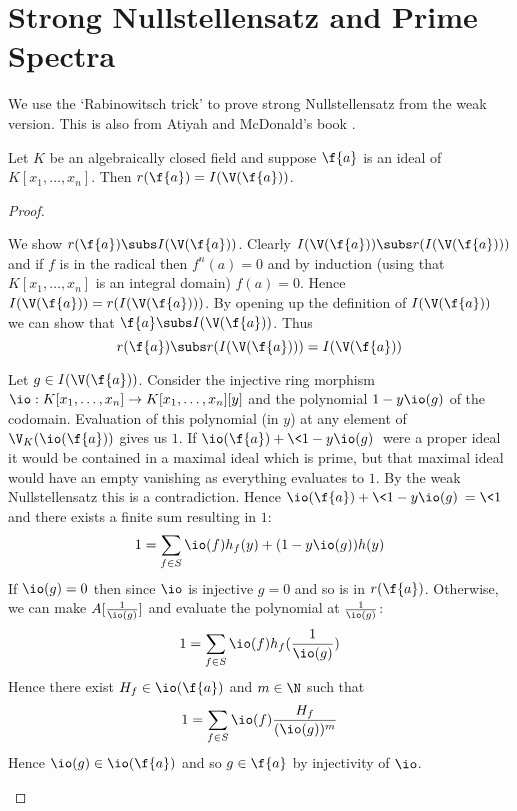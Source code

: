 \section{Strong Nullstellensatz and Prime Spectra}
We use the `Rabinowitsch trick' to prove strong Nullstellensatz
from the weak version. 
This is also from Atiyah and McDonald's book \cite{atiyah}.
\begin{prop}
    Let $K$ be an algebraically closed field and suppose 
    $\f{a}$ is an ideal of $K[x_1,\dots,x_n]$.
    Then $r(\f{a}) = I(\V(\f{a}))$.
\end{prop}
\begin{proof}
    \begin{forward}
        We show 
        $r(\f{a}) \subs I(\V(\f{a}))$.
        Clearly 
        $I(\V(\f{a})) \subs r(I(\V(\f{a})))$
        and if $f$ is in the radical then 
        $f^n (a) = 0$ and by induction 
        (using that $K[x_1,\dots,x_n]$ is an integral domain) $f(a) = 0$.
        Hence $I(\V(\f{a})) = r(I(\V(\f{a})))$.
        By opening up the definition of 
        $I(\V(\f{a}))$ we can show that 
        $\f{a} \subs I(\V(\f{a}))$.
        Thus \[r(\f{a}) \subs r(I(\V(\f{a}))) = I(\V(\f{a}))\]
    \end{forward}
    \begin{backward}
        Let $g \in I(\V(\f{a}))$.
        Consider the injective ring morphism 
        $\io : K[x_1,\dots,x_n] \to K[x_1,\dots,x_n][y]$ 
        and the polynomial $1 - y \io(g)$ of the codomain.
        Evaluation of this polynomial (in $y$) at any element of 
        $\V_K(\io(\f{a}))$
        gives us $1$. 
        If $\io(\f{a}) + \<1 - y \io(g)\>$ 
        were a proper ideal it would be contained in a maximal ideal 
        \cite{atiyah}
        which is prime, but that maximal ideal would have an empty vanishing
        as everything evaluates to $1$.
        By the weak Nullstellensatz this is a contradiction.
        Hence $\io(\f{a}) + \<1 - y \io(g)\> = \<1\>$
        and there exists a finite sum resulting in $1$:
        \[1 = \sum_{f \in S} \io(f)h_f(y) + (1 - y \io(g))h(y)\]
        If $\io(g) = 0$ then since $\io$ is injective $g = 0$ and 
        so is in $r(\f{a})$.
        Otherwise, we can make $A[\frac{1}{\io(g)}]$
        and evaluate the polynomial at $\frac{1}{\io(g)}$:
        \[1 = \sum_{f \in S} \io(f)h_f(\frac{1}{\io(g)})\]
        Hence there exist $H_f \in \io(\f{a})$ and $m \in \N$ such that
        \[1 = \sum_{f \in S} \io(f)\frac{H_f}{(\io(g))^m}\]
        Hence $\io(g) \in \io(\f{a})$ and so $g \in \f{a}$ 
        by injectivity of $\io$.
    \end{backward}
\end{proof}

